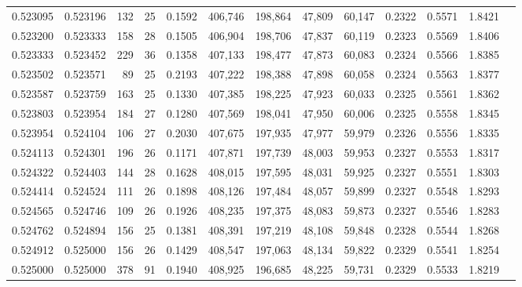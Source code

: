 \begin{tabular}{rrrrrrrrrrrrr}
0.523095 & 0.523196 &    132 &    25 &                                     0.1592 & 406,746 & 198,864 &  47,809 &  60,147 & 0.2322 & 0.5571 & 1.8421 \\
0.523200 & 0.523333 &    158 &    28 &                                     0.1505 & 406,904 & 198,706 &  47,837 &  60,119 & 0.2323 & 0.5569 & 1.8406 \\
0.523333 & 0.523452 &    229 &    36 &                                     0.1358 & 407,133 & 198,477 &  47,873 &  60,083 & 0.2324 & 0.5566 & 1.8385 \\
0.523502 & 0.523571 &     89 &    25 &                                     0.2193 & 407,222 & 198,388 &  47,898 &  60,058 & 0.2324 & 0.5563 & 1.8377 \\
0.523587 & 0.523759 &    163 &    25 &                                     0.1330 & 407,385 & 198,225 &  47,923 &  60,033 & 0.2325 & 0.5561 & 1.8362 \\
0.523803 & 0.523954 &    184 &    27 &                                     0.1280 & 407,569 & 198,041 &  47,950 &  60,006 & 0.2325 & 0.5558 & 1.8345 \\
0.523954 & 0.524104 &    106 &    27 &                                     0.2030 & 407,675 & 197,935 &  47,977 &  59,979 & 0.2326 & 0.5556 & 1.8335 \\
0.524113 & 0.524301 &    196 &    26 &                                     0.1171 & 407,871 & 197,739 &  48,003 &  59,953 & 0.2327 & 0.5553 & 1.8317 \\
0.524322 & 0.524403 &    144 &    28 &                                     0.1628 & 408,015 & 197,595 &  48,031 &  59,925 & 0.2327 & 0.5551 & 1.8303 \\
0.524414 & 0.524524 &    111 &    26 &                                     0.1898 & 408,126 & 197,484 &  48,057 &  59,899 & 0.2327 & 0.5548 & 1.8293 \\
0.524565 & 0.524746 &    109 &    26 &                                     0.1926 & 408,235 & 197,375 &  48,083 &  59,873 & 0.2327 & 0.5546 & 1.8283 \\
0.524762 & 0.524894 &    156 &    25 &                                     0.1381 & 408,391 & 197,219 &  48,108 &  59,848 & 0.2328 & 0.5544 & 1.8268 \\
0.524912 & 0.525000 &    156 &    26 &                                     0.1429 & 408,547 & 197,063 &  48,134 &  59,822 & 0.2329 & 0.5541 & 1.8254 \\
0.525000 & 0.525000 &    378 &    91 &                                     0.1940 & 408,925 & 196,685 &  48,225 &  59,731 & 0.2329 & 0.5533 & 1.8219 \\

\end{tabular}
